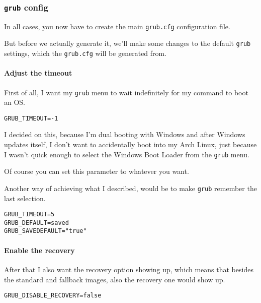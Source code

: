 \documentclass[9pt]{report}
\newenvironment{NOTE}
{\begin{tcolorbox}[colback=admonitionBG,coltitle=draculaFG,colframe=draculaBlue,colbacktitle=draculaBlue,title=NOTE]}
{\end{tcolorbox}}
\begin{document}
\newpage

\hypertarget{x-grub-config}{\subsubsection{\texttt{grub} config}}
In all cases, you now have to create the main \texttt{grub.cfg} configuration file.


But before we actually generate it, we’ll make some changes to the default \texttt{grub} settings, which the \texttt{grub.cfg} will be generated from.



\newpage

\hypertarget{x-adjust-the-timeout}{\paragraph{Adjust the timeout}}
First of all, I want my \texttt{grub} menu to wait indefinitely for my command to boot an OS.


\begin{verbatim}
GRUB_TIMEOUT=-1
\end{verbatim}

\begin{NOTE}
    I decided on this, because I’m dual booting with Windows and after Windows updates itself, I don’t want to accidentally boot into my Arch Linux, just because I wasn’t quick enough to select the Windows Boot Loader from the \texttt{grub} menu.


    Of course you can set this parameter to whatever you want.


    Another way of achieving what I described, would be to make \texttt{grub} remember the last selection.


    \begin{verbatim}
GRUB_TIMEOUT=5
GRUB_DEFAULT=saved
GRUB_SAVEDEFAULT="true"
    \end{verbatim}
\end{NOTE}

\newpage

\hypertarget{x-enable-the-recovery}{\paragraph{Enable the recovery}}
After that I also want the recovery option showing up, which means that besides the standard and fallback images, also the recovery one would show up.


\begin{verbatim}
GRUB_DISABLE_RECOVERY=false
\end{verbatim}
\end{document}
